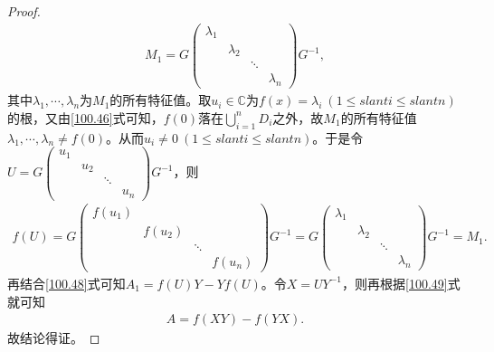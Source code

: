\documentclass[../../main.tex]{subfiles}
\begin{document}
\begin{proof}
\begin{align*}
M_1 = G\begin{pmatrix}
\lambda_1 & & & \\
& \lambda_2 & & \\
& & \ddots & \\
& & & \lambda_n
\end{pmatrix}G^{-1},
\end{align*}
其中$\lambda_1, \cdots, \lambda_n$为$M_1$的所有特征值。取$u_i \in \mathbb{C}$为$f(x) = \lambda_i\ (1 \leqslant slant i \leqslant slant n)$的根，又由\eqref{100.46}式可知，$f(0)$落在$\bigcup_{i=1}^n D_i$之外，故$M_1$的所有特征值$\lambda_1, \cdots, \lambda_n \ne f(0)$。从而$u_i \ne 0\ (1 \leqslant slant i \leqslant slant n)$。于是令$U = G\begin{pmatrix}
u_1 & & & \\
& u_2 & & \\
& & \ddots & \\
& & & u_n
\end{pmatrix}G^{-1}$，则
\begin{align*}
f(U) = G\begin{pmatrix}
f(u_1) & & & \\
& f(u_2) & & \\
& & \ddots & \\
& & & f(u_n)
\end{pmatrix}G^{-1} = G\begin{pmatrix}
\lambda_1 & & & \\
& \lambda_2 & & \\
& & \ddots & \\
& & & \lambda_n
\end{pmatrix}G^{-1} = M_1.
\end{align*}
再结合\eqref{100.48}式可知$A_1 = f(U)Y - Yf(U)$。令$X = UY^{-1}$，则再根据\eqref{100.49}式就可知
\begin{align*}
A = f(XY) - f(YX).
\end{align*}
故结论得证。
\end{proof}
\end{document}
